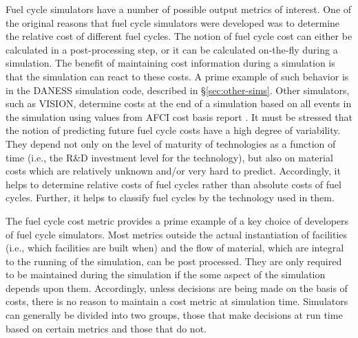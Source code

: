 Fuel cycle simulators have a number of possible output metrics of interest. One
of the original reasons that fuel cycle simulators were developed was to
determine the relative cost of different fuel cycles. The notion of fuel cycle
cost can either be calculated in a post-processing step, or it can be calculated
on-the-fly during a simulation. The benefit of maintaining cost information
during a simulation is that the simulation can react to these costs. A prime
example of such behavior is in the DANESS simulation code, described
in \S\ref{sec:other-sims}. Other simulators, such as VISION, determine costs at
the end of a simulation based on all events in the simulation using values from
AFCI cost basis report \cite{yacout_vision_2006,shropshire_advanced_2007}. It
must be stressed that the notion of predicting future fuel cycle costs have a
high degree of variability. They depend not only on the level of maturity of
technologies as a function of time (i.e., the R\&D investment level for the
technology), but also on material costs which are relatively unknown and/or very
hard to predict. Accordingly, it helps to determine relative costs of fuel
cycles rather than absolute costs of fuel cycles. Further, it helps to classify
fuel cycles by the technology used in them. 

The fuel cycle cost metric provides a prime example of a key choice of
developers of fuel cycle simulators. Most metrics outside the actual
instantiation of facilities (i.e., which facilities are built when) and the flow
of material, which are integral to the running of the simulation, can be post
processed. They are only required to be maintained during the simulation if the
some aspect of the simulation depends upon them. Accordingly, unless decisions
are being made on the basis of costs, there is no reason to maintain a cost
metric at simulation time. Simulators can generally be divided into two groups,
those that make decisions at run time based on certain metrics and those that do
not.

